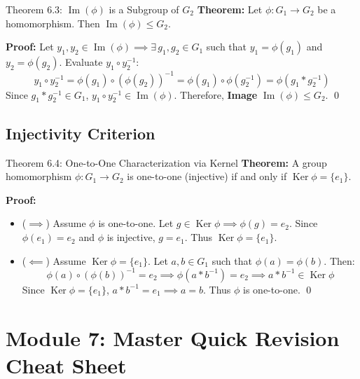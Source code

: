 \documentclass[11pt,a4paper]{article}
\begin{document}
\begin{exbox}{Theorem 6.3: $\operatorname{Im}(\phi)$ is a Subgroup of $G_2$}
\textbf{Theorem:} Let $\phi: G_1 \to G_2$ be a homomorphism. Then $\operatorname{Im}(\phi) \le G_2$.

\textbf{Proof:}
Let $y_1, y_2 \in \operatorname{Im}(\phi) \implies \exists\, g_1, g_2 \in G_1$ such that $y_1 = \phi(g_1)$ and $y_2 = \phi(g_2)$.
Evaluate $y_1 \circ y_2^{-1}$:
\begin{equation}
    y_1 \circ y_2^{-1} = \phi(g_1) \circ (\phi(g_2))^{-1} = \phi(g_1) \circ \phi(g_2^{-1}) = \phi(g_1 * g_2^{-1})
\end{equation}
Since $g_1 * g_2^{-1} \in G_1$, $y_1 \circ y_2^{-1} \in \operatorname{Im}(\phi)$.
Therefore, \textbf{Image} $\operatorname{Im}(\phi) \le G_2$. \qed
\end{exbox}

\subsection{Injectivity Criterion}

\begin{exbox}{Theorem 6.4: One-to-One Characterization via Kernel}
\textbf{Theorem:} A group homomorphism $\phi: G_1 \to G_2$ is one-to-one (injective) if and only if $\operatorname{Ker} \phi = \{e_1\}$.

\textbf{Proof:}
\begin{itemize}
    \item ($\implies$) Assume $\phi$ is one-to-one. Let $g \in \operatorname{Ker} \phi \implies \phi(g) = e_2$. Since $\phi(e_1) = e_2$ and $\phi$ is injective, $g = e_1$. Thus $\operatorname{Ker} \phi = \{e_1\}$.
    
    \item ($\impliedby$) Assume $\operatorname{Ker} \phi = \{e_1\}$. Let $a, b \in G_1$ such that $\phi(a) = \phi(b)$.
    Then:
    \begin{equation}
        \phi(a) \circ (\phi(b))^{-1} = e_2 \implies \phi(a * b^{-1}) = e_2 \implies a * b^{-1} \in \operatorname{Ker} \phi
    \end{equation}
    Since $\operatorname{Ker} \phi = \{e_1\}$, $a * b^{-1} = e_1 \implies a = b$.
    Thus $\phi$ is one-to-one. \qed
\end{itemize}
\end{exbox}

\newpage

\section{Module 7: Master Quick Revision Cheat Sheet}
\end{document}
